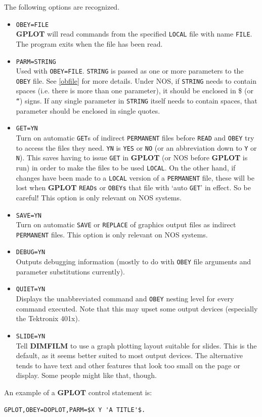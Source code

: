 \documentclass[a4paper,twoside,11pt]{article}
\newcommand{\newpara}{\par\vspace{4mm}\noindent}
\newcommand{\textttc}[1]{\texttt{\textcolor{OurRed}{#1}}}
\begin{document}
\newpara
The following options are recognized.
\begin{itemize}
\item \textttc{OBEY=FILE}\\
   \textbf{GPLOT} will read commands from the specified \texttt{LOCAL} file with name \texttt{FILE}. 
   The program exits when the file has been read.
\item \textttc{PARM=STRING}\\
   Used with \texttt{OBEY=FILE}. \texttt{STRING} is passed as one or more parameters to the \texttt{OBEY} file.
    See \ref{obfile} for more details.
   Under NOS, if \texttt{STRING} needs to contain spaces (i.e. there is more than one parameter), it should be enclosed in
   \$ (or \texttt{``}) signs. If any single parameter in \texttt{STRING} itself needs to contain spaces,
   that parameter should be enclosed in
   single quotes.
\item \textttc{GET=YN}\\
   Turn on automatic \texttt{GET}s of indirect \texttt{PERMANENT} files before \texttt{READ} and \texttt{OBEY} 
   try to access the files they need. \texttt{YN} is
   \texttt{YES} or \texttt{NO} (or an abbreviation down to \texttt{Y} or \texttt{N}). 
   This saves having to issue \texttt{GET} in \textbf{GPLOT} (or NOS before \textbf{GPLOT} is
   run) in order to make the files to be used \texttt{LOCAL}. On the other hand, if changes have been made to a \texttt{LOCAL} version
   of a \texttt{PERMANENT} file, these will be lost when \textbf{GPLOT} \texttt{READs} or \texttt{OBEYs} 
   that file with `auto \texttt{GET}' in effect. So be 
   careful! This option is only relevant on NOS systems.
 \item \textttc{SAVE=YN}\\
   Turn on automatic \texttt{SAVE} or \texttt{REPLACE} of graphics output files as indirect \texttt{PERMANENT} files.
   This option is only relevant on NOS systems.
\item \textttc{DEBUG=YN}\\
   Outputs debugging information (mostly to do with \texttt{OBEY} file arguments and parameter substitutions currently).
\item \textttc{QUIET=YN}\\
   Displays the unabbreviated command and \texttt{OBEY} nesting level for every command executed. Note that this may
   upset some output devices (especially the Tektronix 401x).
\item \textttc{SLIDE=YN}\\
	Tell \textbf{DIMFILM} to use a graph plotting layout suitable for slides. This is the default, as it seems better suited to most
	output devices. The alternative tends to have text and other features that look too small on the page or display. Some
	people might like that, though. 
\end{itemize}
An example of a \textbf{GPLOT} control statement is:
\begin{verbatim}
GPLOT,OBEY=DOPLOT,PARM=$X Y 'A TITLE'$.
\end{verbatim}
\end{document}
